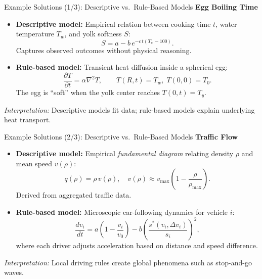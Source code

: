 \documentclass{beamer}
\begin{document}
\begin{frame}{Example Solutions (1/3): Descriptive vs.\ Rule-Based Models}
\small
\textbf{Egg Boiling Time}
\begin{itemize}
    \item \textbf{Descriptive model:}
          Empirical relation between cooking time $t$, water temperature $T_w$,
          and yolk softness $S$:
          \[
          S = a - b\,e^{-c\,t(T_w - 100)}.
          \]
          Captures observed outcomes without physical reasoning.

    \item \textbf{Rule-based model:}
          Transient heat diffusion inside a spherical egg:
          \[
          \frac{\partial T}{\partial t} = \alpha \nabla^2 T, \qquad
          T(R,t)=T_w,\; T(0,0)=T_0.
          \]
          The egg is “soft” when the yolk center reaches $T(0,t)=T_y$.
\end{itemize}

\vspace{0.5em}
\textit{Interpretation:}  
Descriptive models fit data; rule-based models explain underlying heat transport.
\end{frame}

\begin{frame}{Example Solutions (2/3): Descriptive vs.\ Rule-Based Models}
\tiny
\textbf{Traffic Flow}
\begin{itemize}
    \item \textbf{Descriptive model:}
          Empirical \emph{fundamental diagram} relating density $\rho$ and mean speed $v(\rho)$:
          \[
          q(\rho) = \rho\,v(\rho),
          \quad v(\rho) \approx v_\text{max}\!\left(1 - \frac{\rho}{\rho_\text{max}}\right).
          \]
          Derived from aggregated traffic data.

    \item \textbf{Rule-based model:}
          Microscopic car-following dynamics for vehicle $i$:
          \[
          \frac{dv_i}{dt}
          = a\!\left(1-\frac{v_i}{v_0}\right)
          - b\!\left(\frac{s^*(v_i,\Delta v_i)}{s_i}\right)^2,
          \]
          where each driver adjusts acceleration based on distance and speed difference.
\end{itemize}

\vspace{0.5em}
\textit{Interpretation:}  
Local driving rules create global phenomena such as stop-and-go waves.
\end{frame}
\end{document}

